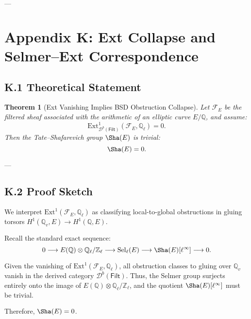 \documentclass[11pt]{article}
\newtheorem{theorem}{Theorem}[section]
\theoremstyle{definition}
\begin{document}
---






\section*{Appendix K: Ext Collapse and Selmer--Ext Correspondence}

\subsection*{K.1 Theoretical Statement}

\begin{theorem}[Ext Vanishing Implies BSD Obstruction Collapse]
Let \( \mathcal{F}_E \) be the filtered sheaf associated with the arithmetic of an elliptic curve \( E/\mathbb{Q} \), and assume:
\[
\mathrm{Ext}^1_{\mathcal{D}^b(\mathsf{Filt})}(\mathcal{F}_E, \mathbb{Q}_\ell) = 0.
\]
Then the Tate–Shafarevich group \( \Sha(E) \) is trivial:
\[
\Sha(E) = 0.
\]
\end{theorem}

---

\subsection*{K.2 Proof Sketch}

We interpret \( \mathrm{Ext}^1(\mathcal{F}_E, \mathbb{Q}_\ell) \) as classifying local-to-global obstructions in gluing torsors \( H^1(\mathbb{Q}_v, E) \to H^1(\mathbb{Q}, E) \).  

Recall the standard exact sequence:
\[
0 \longrightarrow E(\mathbb{Q}) \otimes \mathbb{Q}_\ell/\mathbb{Z}_\ell \longrightarrow \mathrm{Sel}_\ell(E) \longrightarrow \Sha(E)[\ell^\infty] \longrightarrow 0.
\]

Given the vanishing of \( \mathrm{Ext}^1(\mathcal{F}_E, \mathbb{Q}_\ell) \), all obstruction classes to gluing over \( \mathbb{Q}_v \) vanish in the derived category \( \mathcal{D}^b(\mathsf{Filt}) \). Thus, the Selmer group surjects entirely onto the image of \( E(\mathbb{Q}) \otimes \mathbb{Q}_\ell/\mathbb{Z}_\ell \), and the quotient \( \Sha(E)[\ell^\infty] \) must be trivial.

Therefore, \( \Sha(E) = 0 \).
\end{document}

